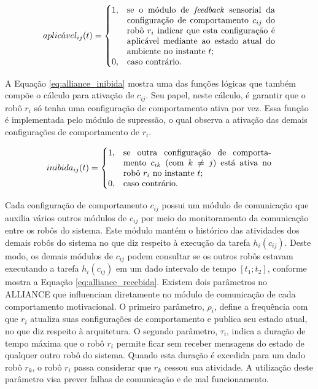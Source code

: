     \begin{equation} \label{eq:alliance_aplicavel}
        aplic\acute{a}vel_{ij}(t) =
        \begin{cases}
            1, & \parbox[t]{.5\textwidth}{se o módulo de \textit{feedback} sensorial da configuração de comportamento $c_{ij}$ do robô $r_i$ indicar que esta configuração é aplicável mediante ao estado atual do ambiente no instante $t$;} \\
            0, & \text{caso contrário.}
        \end{cases}
    \end{equation}
    
    A Equação \ref{eq:alliance_inibida} mostra uma das funções lógicas que também compõe o cálculo para ativação de $c_{ij}$. Seu papel, neste cálculo, é garantir que o robô $r_i$ só tenha uma configuração de comportamento ativa por vez. Essa função é implementada pelo módulo de supressão, o qual observa a ativação das demais configurações de comportamento de $r_i$. 
    
    \begin{equation} \label{eq:alliance_inibida}
        inibida_{ij}(t) =
        \begin{cases}
            1, & \parbox[t]{.5\textwidth}{se outra configuração de comportamento $c_{ik}$ (com $k \neq j$) está ativa no robô $r_i$ no instante $t$;} \\
            0, & \text{caso contrário.}
        \end{cases}
    \end{equation}
    
    Cada configuração de comportamento $c_{ij}$ possui um módulo de comunicação que auxilia vários outros módulos de $c_{ij}$ por meio do monitoramento da comunicação entre os robôs do sistema. Este módulo mantém o histórico das atividades dos demais robôs do sistema no que diz respeito à execução da tarefa $h_i(c_{ij})$. Deste modo, os demais módulos de $c_{ij}$ podem consultar se os outros robôs estavam executando a tarefa $h_i(c_{ij})$ em um dado intervalo de tempo $[t_1; t_2]$, conforme mostra a Equação \ref{eq:alliance_recebida}. Existem dois parâmetros no ALLIANCE que influenciam diretamente no módulo de comunicação de cada comportamento motivacional. O primeiro parâmetro, $\rho_i$, define a frequência com que $r_i$ atualiza suas configurações de comportamento e publica seu estado atual, no que diz respeito à arquitetura. O segundo parâmetro, $\tau_i$, indica a duração de tempo máxima que o robô $r_i$ permite ficar sem receber mensagens do estado de qualquer outro robô do sistema. Quando esta duração é excedida para um dado robô $r_k$, o robô $r_i$ passa considerar que $r_k$ cessou sua atividade. A utilização deste parâmetro visa prever falhas de comunicação e de mal funcionamento.
    

